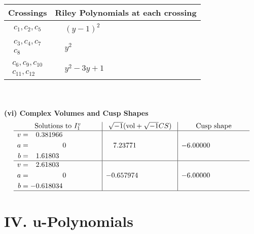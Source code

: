 \documentclass[1p]{elsarticle_modified}
\theoremstyle{definition}
\newcommand{\I}{\sqrt{-1}}
\begin{document}
\begin{tabular}{m{50pt}|m{274pt}}
Crossings & \hspace{64pt}Riley Polynomials at each crossing \\
\hline $$\begin{aligned}c_{1},c_{2},c_{5}\end{aligned}$$&$\begin{aligned}
&(y-1)^2
\end{aligned}$\\
\hline $$\begin{aligned}c_{3},c_{4},c_{7}\\c_{8}\end{aligned}$$&$\begin{aligned}
&y^2
\end{aligned}$\\
\hline $$\begin{aligned}c_{6},c_{9},c_{10}\\c_{11},c_{12}\end{aligned}$$&$\begin{aligned}
&y^2-3 y+1
\end{aligned}$\\
\hline
\end{tabular}\\~\\
\newpage\flushleft \textbf{(vi) Complex Volumes and Cusp Shapes}
$$\begin{array}{c|c|c}  
\text{Solutions to }I^v_{1}& \I (\text{vol} + \sqrt{-1}CS) & \text{Cusp shape}\\
 \hline 
\begin{aligned}
v &= \phantom{-}0.381966\phantom{ +0.000000I} \\
a &= \phantom{-0.000000 } 0 \\
b &= \phantom{-}1.61803\phantom{ +0.000000I}\end{aligned}
 & \phantom{-}7.23771\phantom{ +0.000000I} & -6.00000\phantom{ +0.000000I} \\ \hline\begin{aligned}
v &= \phantom{-}2.61803\phantom{ +0.000000I} \\
a &= \phantom{-0.000000 } 0 \\
b &= -0.618034\phantom{ +0.000000I}\end{aligned}
 & -0.657974\phantom{ +0.000000I} & -6.00000\phantom{ +0.000000I}\\
 \hline 
 \end{array}$$\newpage
\newpage\renewcommand{\arraystretch}{1}
\centering \section*{ IV. u-Polynomials}
\end{document}
